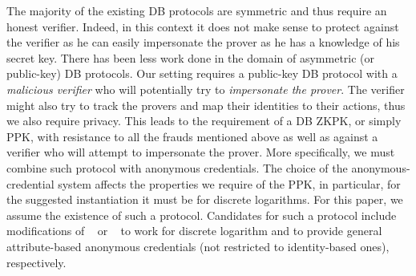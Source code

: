 The majority of the existing \ac{DB} protocols are symmetric and thus require an honest verifier.
Indeed, in this context it does not make sense to protect against the verifier as he can easily impersonate the prover as he has a knowledge of his secret key.
There has been less work done in the domain of asymmetric (or public-key) \ac{DB} protocols.
Our setting requires a public-key \ac{DB} protocol with a \emph{malicious verifier} who will potentially try to \emph{impersonate the prover}.
The verifier might also try to track the provers and map their identities to their actions, thus we also require privacy.
This leads to the requirement of a \ac{DB} \ac{ZKPK}, or simply \ac{PPK}, with resistance to all the frauds mentioned above as well as against a verifier who will attempt to impersonate the prover.
More specifically, we must combine such  protocol with anonymous 
credentials.
The choice of the anonymous-credential system affects the properties we 
require of the \ac{PPK}, in particular, for the suggested instantiation it must 
be  for discrete logarithms.
For this paper, we assume the existence of such a protocol. Candidates for such a protocol include modifications of ~\cite{ProProx} or ~\cite{PROPS} to work for discrete logarithm and to provide general attribute-based anonymous credentials (not restricted to identity-based ones), respectively.
